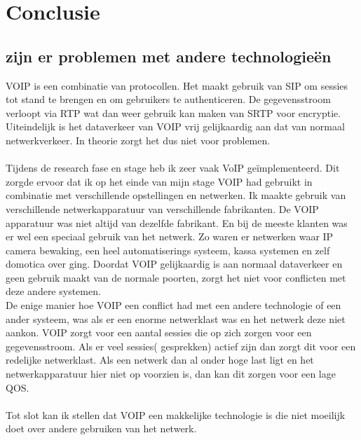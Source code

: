 \documentclass[pdftex,a4paper,12pt,twoside]{report}
\begin{document}
\chapter{Conclusie}
\label{ch:conclusie}

\section{zijn er problemen met andere technologieën}
VOIP is een combinatie van protocollen. Het maakt gebruik van SIP om sessies tot stand te brengen en om gebruikers te authenticeren. De gegevensstroom verloopt via RTP wat dan weer gebruik kan maken van SRTP voor encryptie. Uiteindelijk is het dataverkeer van VOIP vrij gelijkaardig aan dat van normaal netwerkverkeer. In theorie zorgt het dus niet voor problemen.
\\ \\
Tijdens de research fase en stage heb ik zeer vaak VoIP geïmplementeerd. Dit zorgde ervoor dat ik op het einde van mijn stage VOIP had gebruikt in combinatie met verschillende opstellingen en netwerken. Ik maakte gebruik van verschillende netwerkapparatuur van verschillende fabrikanten. De VOIP apparatuur was niet altijd van dezelfde fabrikant. En bij de meeste klanten was er wel een speciaal gebruik van het netwerk. Zo waren er netwerken waar IP camera bewaking, een heel automatiserings systeem, kassa systemen en zelf domotica over ging. Doordat VOIP gelijkaardig is aan normaal dataverkeer en geen gebruik maakt van de normale poorten, zorgt het niet voor conflicten met deze andere systemen.\\
De enige manier hoe VOIP een conflict had met een andere technologie of een ander systeem, was als er een enorme netwerklast was en het netwerk deze niet aankon. VOIP zorgt voor een aantal sessies die op zich zorgen voor een gegevensstroom. Als er veel sessies( gesprekken) actief zijn dan zorgt dit voor een redelijke netwerklast. Als een netwerk dan al onder hoge last ligt en het netwerkapparatuur hier niet op voorzien is, dan kan dit zorgen voor een lage QOS. 
\\ \\
Tot slot kan ik stellen dat VOIP een makkelijke technologie is die niet moeilijk doet over andere gebruiken van het netwerk.
\end{document}
